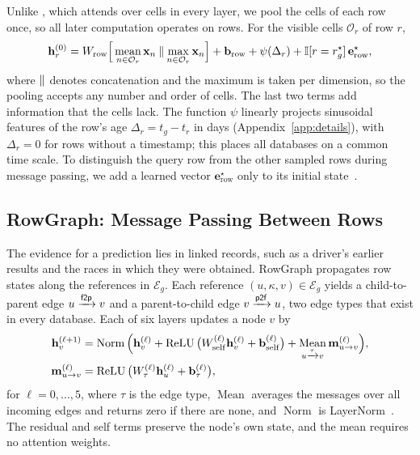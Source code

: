 Unlike \RT{}, which attends over cells in every layer, we pool the cells of
each row once, so all later computation operates on rows. For the visible
cells $\mathcal O_r$ of row $r$,
\begin{equation}
 \mathbf h_r^{(0)}=W_{\mathrm{row}}\Big[
 \operatorname*{mean}_{n\in\mathcal O_r}\mathbf x_n
 \mathbin\Vert\operatorname*{max}_{n\in\mathcal O_r}\mathbf x_n\Big]
 +\mathbf b_{\mathrm{row}}
 +\psi(\Delta_r)+\mathbb{I}[r=r_g^\star]\,\mathbf e^\star_{\mathrm{row}},
 \label{eq:rowencoding}
\end{equation}
where $\mathbin\Vert$ denotes concatenation and the maximum is taken per dimension,
so the pooling accepts any number and order of cells. The last two terms add
information that the cells lack. The function $\psi$ linearly projects
sinusoidal features of the row's age $\Delta_r=t_g-t_r$ in days
(Appendix~\ref{app:details}), with $\Delta_r=0$ for rows without a timestamp;
this places all databases on a common time scale. To distinguish the query
row from the other sampled rows during message passing, we add a learned
vector $\mathbf e^\star_{\mathrm{row}}$ only to its initial
state~\citep{zhang2021labeling}.

\subsection{RowGraph: Message Passing Between Rows}
\label{sec:method:rowgraph}

The evidence for a prediction lies in linked records, such as a driver's
earlier results and the races in which they were obtained. RowGraph
propagates row states along the references in $\mathcal E_g$. Each reference
$(u,\kappa,v)\in\mathcal E_g$ yields a child-to-parent edge $u\xrightarrow{\mathsf{f2p}}v$ and a
parent-to-child edge $v\xrightarrow{\mathsf{p2f}}u$, two edge types that exist in
every database. Each of six layers updates a node $v$ by
\begin{equation}
 \begin{aligned}
 \mathbf h_v^{(\ell+1)}&=\operatorname{Norm}\Big(
 \mathbf h_v^{(\ell)}
 +\operatorname{ReLU}\big(W_{\mathrm{self}}^{(\ell)}\mathbf h_v^{(\ell)}+\mathbf b_{\mathrm{self}}^{(\ell)}\big)
 +\operatorname*{Mean}_{u\xrightarrow{\tau}v}\mathbf m_{u\to v}^{(\ell)}\Big),\\
 \mathbf m_{u\to v}^{(\ell)}&=\operatorname{ReLU}\big(W_\tau^{(\ell)}\mathbf h_u^{(\ell)}+\mathbf b_\tau^{(\ell)}\big),
 \end{aligned}
 \label{eq:rowmp}
\end{equation}
for $\ell=0,\ldots,5$, where $\tau$ is the edge type, $\operatorname{Mean}$
averages the messages over all incoming edges and returns zero if there are
none, and $\operatorname{Norm}$ is LayerNorm~\citep{ba2016layernorm}. The
residual and self terms preserve the node's own state, and the mean requires
no attention weights.

